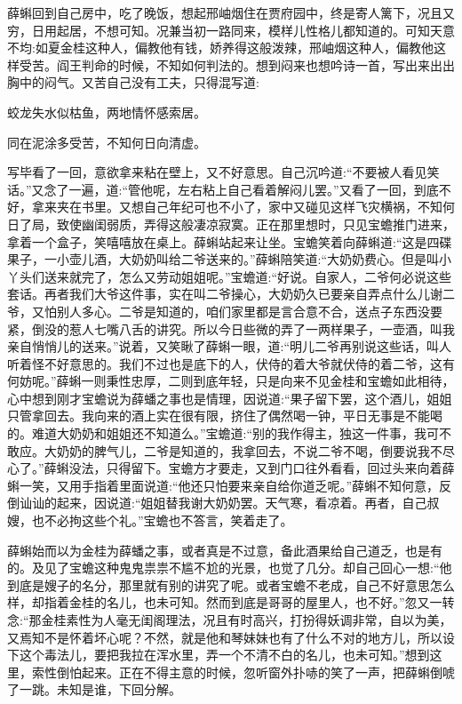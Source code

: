 \begin{parag}
    薛蝌回到自己房中，吃了晚饭，想起邢岫烟住在贾府园中，终是寄人篱下，况且又穷，日用起居，不想可知。况兼当初一路同来，模样儿性格儿都知道的。可知天意不均:如夏金桂这种人，偏教他有钱，娇养得这般泼辣，邢岫烟这种人，偏教他这样受苦。阎王判命的时候，不知如何判法的。想到闷来也想吟诗一首，写出来出出胸中的闷气。又苦自己没有工夫，只得混写道:
\end{parag}


\begin{poem}
    \begin{pl}
        蛟龙失水似枯鱼，两地情怀感索居。
    \end{pl}


    \begin{pl}
        同在泥涂多受苦，不知何日向清虚。
    \end{pl}
\end{poem}


\begin{parag}
    写毕看了一回，意欲拿来粘在壁上，又不好意思。自己沉吟道:“不要被人看见笑话。”又念了一遍，道:“管他呢，左右粘上自己看着解闷儿罢。”又看了一回，到底不好，拿来夹在书里。又想自己年纪可也不小了，家中又碰见这样飞灾横祸，不知何日了局，致使幽闺弱质，弄得这般凄凉寂寞。正在那里想时，只见宝蟾推门进来，拿着一个盒子，笑嘻嘻放在桌上。薛蝌站起来让坐。宝蟾笑着向薛蝌道:“这是四碟果子，一小壶儿酒，大奶奶叫给二爷送来的。”薛蝌陪笑道:“大奶奶费心。但是叫小丫头们送来就完了，怎么又劳动姐姐呢。”宝蟾道:“好说。自家人，二爷何必说这些套话。再者我们大爷这件事，实在叫二爷操心，大奶奶久已要亲自弄点什么儿谢二爷，又怕别人多心。二爷是知道的，咱们家里都是言合意不合，送点子东西没要紧，倒没的惹人七嘴八舌的讲究。所以今日些微的弄了一两样果子，一壶酒，叫我亲自悄悄儿的送来。”说着，又笑瞅了薛蝌一眼，道:“明儿二爷再别说这些话，叫人听着怪不好意思的。我们不过也是底下的人，伏侍的着大爷就伏侍的着二爷，这有何妨呢。”薛蝌一则秉性忠厚，二则到底年轻，只是向来不见金桂和宝蟾如此相待，心中想到刚才宝蟾说为薛蟠之事也是情理，因说道:“果子留下罢，这个酒儿，姐姐只管拿回去。我向来的酒上实在很有限，挤住了偶然喝一钟，平日无事是不能喝的。难道大奶奶和姐姐还不知道么。”宝蟾道:“别的我作得主，独这一件事，我可不敢应。大奶奶的脾气儿，二爷是知道的，我拿回去，不说二爷不喝，倒要说我不尽心了。”薛蝌没法，只得留下。宝蟾方才要走，又到门口往外看看，回过头来向着薛蝌一笑，又用手指着里面说道:“他还只怕要来亲自给你道乏呢。”薛蝌不知何意，反倒讪讪的起来，因说道:“姐姐替我谢大奶奶罢。天气寒，看凉着。再者，自己叔嫂，也不必拘这些个礼。”宝蟾也不答言，笑着走了。
\end{parag}


\begin{parag}
    薛蝌始而以为金桂为薛蟠之事，或者真是不过意，备此酒果给自己道乏，也是有的。及见了宝蟾这种鬼鬼祟祟不尴不尬的光景，也觉了几分。却自己回心一想:“他到底是嫂子的名分，那里就有别的讲究了呢。或者宝蟾不老成，自己不好意思怎么样，却指着金桂的名儿，也未可知。然而到底是哥哥的屋里人，也不好。”忽又一转念:“那金桂素性为人毫无闺阁理法，况且有时高兴，打扮得妖调非常，自以为美，又焉知不是怀着坏心呢？不然，就是他和琴妹妹也有了什么不对的地方儿，所以设下这个毒法儿，要把我拉在浑水里，弄一个不清不白的名儿，也未可知。”想到这里，索性倒怕起来。正在不得主意的时候，忽听窗外扑哧的笑了一声，把薛蝌倒唬了一跳。未知是谁，下回分解。
\end{parag}